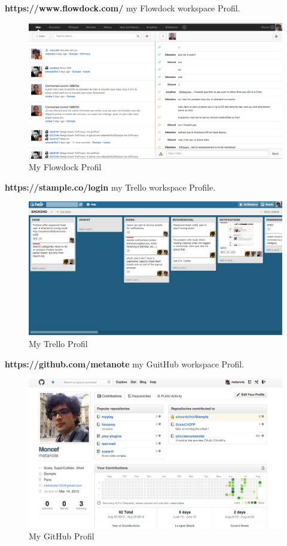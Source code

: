 \textbf{https://www.flowdock.com/} my Flowdock workspace Profil.
\begin{figure}[H]
        \centering
                \centering
                \includegraphics[width=\textwidth]{Flowdock.png}
               \caption{My Flowdock Profil}

\end{figure}
\newpage
\textbf{https://stample.co/login} my Trello workspace Profile.
\begin{figure}[H]
        \centering
                \centering
                \includegraphics[width=\textwidth]{trello.png}
               	\caption{My Trello Profil}

\end{figure}
\textbf{https://github.com/metanote} my GuitHub workspace Profil.
\begin{figure}[H]
        \centering
                \centering
                \includegraphics[width=\textwidth]{gitProfile.png}
               \caption{My GitHub Profil}

\end{figure}
